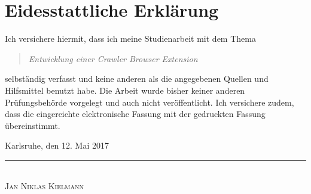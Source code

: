 \chapter*{Eidesstattliche Erklärung}
Ich versichere hiermit, dass ich meine Studienarbeit mit dem Thema
\begin{quote}
\textit{Entwicklung einer Crawler Browser Extension}
\end{quote}
selbständig verfasst und keine anderen als die angegebenen Quellen und Hilfsmittel benutzt habe. Die Arbeit wurde bisher keiner anderen Prüfungsbehörde vorgelegt und auch nicht veröffentlicht. Ich versichere zudem, dass die eingereichte elektronische Fassung mit der gedruckten Fassung übereinstimmt.


Karlsruhe, den 12. Mai 2017 \\


\rule[-0.2cm]{5cm}{0.5pt} \\

\vspace{-0.4cm}
\textsc{Jan Niklas Kielmann} \\
